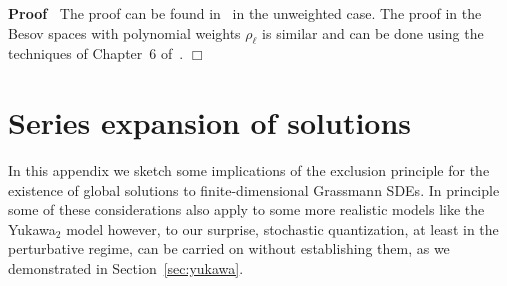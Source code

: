 \documentclass[11pt]{article}
\newenvironment{proof}{\noindent\textbf{Proof\ }}{\hspace*{\fill}$\Box$\medskip}
\begin{document}
\begin{proof}
  The proof can be found in~{\cite{Amann2019}} in the unweighted case. The
  proof in the Besov spaces with polynomial weights $\rho_{\ell}$ is similar
  and can be done using the techniques of Chapter~6 of~{\cite{TriebelIII}}. 
\end{proof}

\section{Series expansion of solutions}\label{app:series}

In this appendix we sketch some implications of the exclusion principle for
the existence of global solutions to finite-dimensional Grassmann SDEs. In
principle some of these considerations also apply to some more realistic
models like the Yukawa$_2$ model however, to our surprise, stochastic
quantization, at least in the perturbative regime, can be carried on without
establishing them, as we demonstrated in Section~\ref{sec:yukawa}.

\
\end{document}
